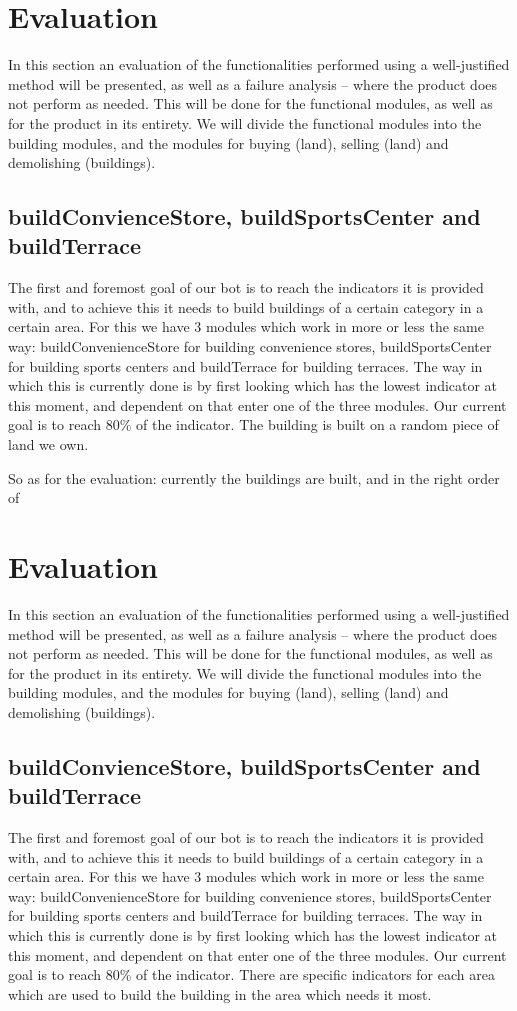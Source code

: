 \section{Evaluation}
In this section an evaluation of the functionalities performed using a well-justified method will be presented, as well as a failure analysis – where the product does not perform as needed. This will be done for the functional modules, as well as for the product in its entirety. We will divide the functional modules into the building modules, and the modules for buying (land), selling (land) and demolishing (buildings).
\subsection{buildConvienceStore, buildSportsCenter and buildTerrace}
The first and foremost goal of our bot is to reach the indicators it is provided with, and to achieve this it needs to build buildings of a certain category in a certain area. For this we have 3 modules which work in more or less the same way: buildConvenienceStore for building convenience stores, buildSportsCenter for building sports centers and buildTerrace for building terraces. The way in which this is currently done is by first looking which has the lowest indicator at this moment, and dependent on that enter one of the three modules. Our current goal is to reach 80\% of the indicator. The building is built on a random piece of land we own. 

So as for the evaluation: currently the buildings are built, and in the right order of \section{Evaluation}
In this section an evaluation of the functionalities performed using a well-justified method will be presented, as well as a failure analysis – where the product does not perform as needed. This will be done for the functional modules, as well as for the product in its entirety. We will divide the functional modules into the building modules, and the modules for buying (land), selling (land) and demolishing (buildings).
\subsection{buildConvienceStore, buildSportsCenter and buildTerrace}
The first and foremost goal of our bot is to reach the indicators it is provided with, and to achieve this it needs to build buildings of a certain category in a certain area. For this we have 3 modules which work in more or less the same way: buildConvenienceStore for building convenience stores, buildSportsCenter for building sports centers and buildTerrace for building terraces. The way in which this is currently done is by first looking which has the lowest indicator at this moment, and dependent on that enter one of the three modules. Our current goal is to reach 80\% of the indicator. There are specific indicators for each area which are used to build the building in the area which needs it most. 

